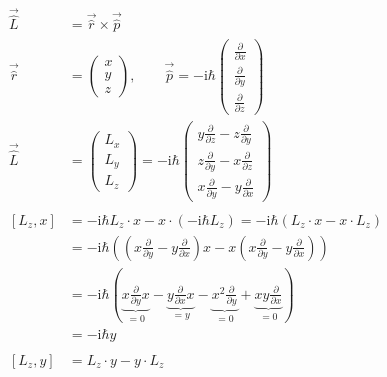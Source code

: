     \begin{align*}
        \vec{\hat{L}} &= \vec{\hat{r}} \times \vec{\hat{p}}\\
        \vec{\hat{r}} &= 
        \begin{pmatrix}
            x\\
            y\\
            z
        \end{pmatrix},
        \qquad \vec{\hat{p}} = -\text{i}\hbar
        \begin{pmatrix}
            \frac{\partial}{\partial x}\\
            \frac{\partial}{\partial y}\\
            \frac{\partial}{\partial z}
        \end{pmatrix}\\
        \vec{\hat{L}} &= 
        \begin{pmatrix}
            L_x\\
            L_y\\
            L_z
        \end{pmatrix}
        = 
        -\text{i}\hbar
        \begin{pmatrix}
            y\frac{\partial}{\partial z} - z\frac{\partial}{\partial y}\\
            z\frac{\partial}{\partial y} - x\frac{\partial}{\partial z}\\
            x\frac{\partial}{\partial y} - y\frac{\partial}{\partial x}
        \end{pmatrix}\\
        \\
        \left[ L_z,x \right] &= -\text{i}\hbar L_z\cdot x - x \cdot \left( -\text{i}\hbar L_z \right) = -\text{i}\hbar \left( L_z\cdot x - x \cdot L_z \right)\\
        &= -\text{i}\hbar \left( \left( x\frac{\partial}{\partial y} - y\frac{\partial}{\partial x} \right)x - x \left( x\frac{\partial}{\partial y} - y\frac{\partial}{\partial x} \right) \right)\\
        &= -\text{i}\hbar \left( \underbrace{x\frac{\partial}{\partial y}x}_{=0} - \underbrace{y\frac{\partial}{\partial x}x}_{=y} - \underbrace{x^2\frac{\partial}{\partial y}}_{=0} + \underbrace{xy\frac{\partial}{\partial x}}_{=0} \right)\\
        &= -\text{i}\hbar y\\
        \\
        \left[ L_z,y \right] &= L_z\cdot y - y \cdot L_z\\

\end{align*}
